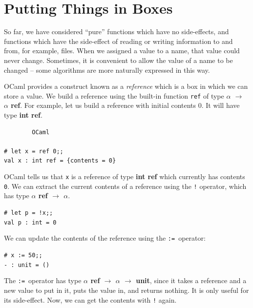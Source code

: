 \documentclass[]{book}
\newcommand{\smspace}{\vspace{4mm}}
\begin{document}
\cleardoublepage
\thispagestyle{empty}


\pagestyle{empty}


\chapter{Putting Things in Boxes}
\pagestyle{fancy}

So far, we have considered ``pure'' functions which have no side-effects, and functions which have the side-effect of reading or writing information to and from, for example, files. When we assigned a value to a name, that value could never change. Sometimes, it is convenient to allow the value of a name to be changed -- some algorithms are more naturally expressed in this way.

OCaml provides a construct known as a \textit{reference} which is a box in which we can store a value. We build a reference using the built-in function \texttt{ref} of type \textsf{\textbf{$\alpha$ $\rightarrow$ $\alpha$ ref}}. For example, let us build a reference with initial contents $0$. It will have type \textsf{\textbf{int ref}}.

\smspace
\noindent\verb!        OCaml!\\
\noindent\\
\noindent\verb!# let x = ref 0;;!\\
\noindent\verb!val x : int ref = {contents = 0}!
\smspace

\noindent OCaml tells us that \texttt{x} is a reference of type \textsf{\textbf{int ref}} which currently has contents \texttt{0}. We can extract the current contents of a reference using the \texttt{!} operator, which has type \textsf{\textbf{$\alpha$ ref $\rightarrow$ $\alpha$}}.

\smspace
\noindent\verb$# let p = !x;;$\\
\noindent\verb!val p : int = 0!
\smspace

\noindent We can update the contents of the reference using the \texttt{:=}\, operator:

\smspace
\noindent\verb$# x := 50;;$\\
\noindent\verb!- : unit = ()!
\smspace

\noindent The \texttt{:=}\, operator has type \textsf{\textbf{$\alpha$ ref $\rightarrow$ $\alpha$ $\rightarrow$ unit}}, since it takes a reference and a new value to put in it,  puts the value in, and returns nothing. It is only useful for its side-effect. Now, we can get the contents with \texttt{!} again.
\end{document}

